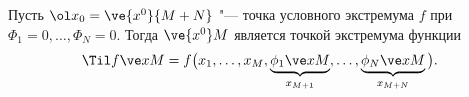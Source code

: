 Пусть \(\ol x_0 = \ve{x^0}{M+N}\) "--- точка условного экстремума \(f\) при \(\Phi_1=0,\ldots,\Phi_N=0\). Тогда \(\ve{x^0}M\) является точкой экстремума функции
\[\Til f\ve xM = f \big(x_1,\ldots,x_M,\underbrace{\phi_1\ve xM}_{x_{M+1}},\ldots,\underbrace{\phi_N\ve xM}_{x_{M+N}}\big).\]
